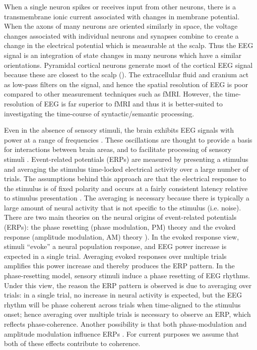 When a single neuron spikes or receives input from other neurons, there is a transmembrane ionic current associated with changes in membrane potential. When the axons of many neurons are oriented similarly in space, the voltage changes associated with individual neurons and synapses combine to create a change in the electrical potential which is measurable at the scalp. Thus the EEG signal is an integration of state changes in many neurons which have a similar orientations. Pyramidal cortical neurons generate most of the cortical EEG signal because these are closest to the scalp (\citealt{FedermeierLaszlo2009,KutasDale1997}). The extracellular fluid and cranium act as low-pass filters on the signal, and hence the spatial resolution of EEG is poor compared to other measurement techniques such as fMRI. However, the time-resolution of EEG is far superior to fMRI and thus it is better-suited to investigating the time-course of syntactic/semantic processing. 

Even in the absence of sensory stimuli, the brain exhibits EEG signals with power at a range of frequencies \citep{Buzsaki2006}. These oscillations are thought to provide a basis for interactions between brain areas, and to facilitate processing of sensory stimuli \citep{FriesEtAl2001,GrayEtAl1989}. Event-related potentials (ERPs) are measured by presenting a stimulus and averaging the stimulus time-locked electrical activity over a large number of trials. The assumptions behind this approach are that the electrical response to the stimulus is of fixed polarity and occurs at a fairly consistent latency relative to stimulus presentation \citep{PennyEtAl2002}. The averaging is necessary because there is typically a large amount of neural activity that is not specific to the stimulus (i.e. noise). There are two main theories on the neural origins of event-related potentials (ERPs): the phase resetting (phase modulation, PM) theory and the evoked response (amplitude modulation, AM) theory \citep{MakeigEtAl2002,PennyEtAl2002,ShahEtAl2004}). In the evoked response view, stimuli “evoke” a neural population response, and EEG power increase is expected in a single trial. Averaging evoked responses over multiple trials amplifies this power increase and thereby produces the ERP pattern. In the phase-resetting model, sensory stimuli induce a phase resetting of EEG rhythms. Under this view, the reason the ERP pattern is observed is due to averaging over trials: in a single trial, no increase in neural activity is expected, but the EEG rhythm will be phase coherent across trials when time-aligned to the stimulus onset; hence averaging over multiple trials is necessary to observe an ERP, which reflects phase-coherence. Another possibility is that both phase-modulation and amplitude modulation influence ERPs \citep{PennyEtAl2002,ShahEtAl2004}. For current purposes we assume that both of these effects contribute to coherence. 

